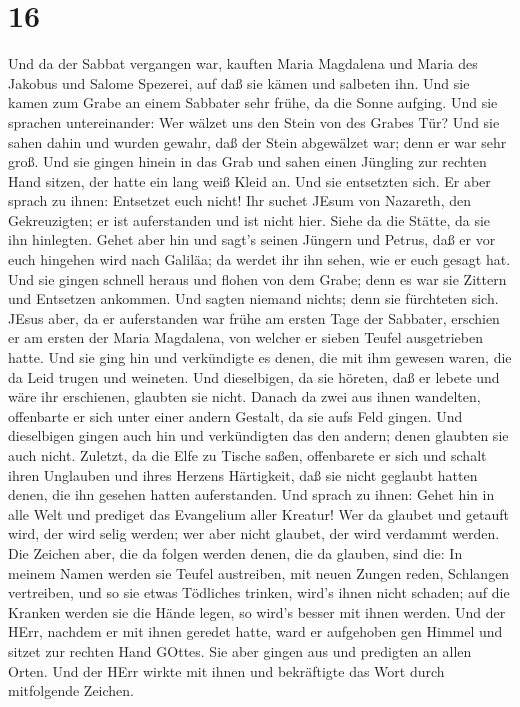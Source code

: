 \hypertarget{section-15}{%
\section{16}\label{section-15}}

 Und da der Sabbat vergangen war, kauften Maria Magdalena
und Maria des Jakobus und Salome Spezerei, auf daß sie kämen und
salbeten ihn.  Und sie kamen zum Grabe an einem Sabbater
sehr frühe, da die Sonne aufging.  Und sie sprachen
untereinander: Wer wälzet uns den Stein von des Grabes Tür? 
Und sie sahen dahin und wurden gewahr, daß der Stein abgewälzet war;
denn er war sehr groß.  Und sie gingen hinein in das Grab
und sahen einen Jüngling zur rechten Hand sitzen, der hatte ein lang
weiß Kleid an. Und sie entsetzten sich.  Er aber sprach zu
ihnen: Entsetzet euch nicht! Ihr suchet JEsum von Nazareth, den
Gekreuzigten; er ist auferstanden und ist nicht hier. Siehe da die
Stätte, da sie ihn hinlegten.  Gehet aber hin und sagt's
seinen Jüngern und Petrus, daß er vor euch hingehen wird nach Galiläa;
da werdet ihr ihn sehen, wie er euch gesagt hat.  Und sie
gingen schnell heraus und flohen von dem Grabe; denn es war sie Zittern
und Entsetzen ankommen. Und sagten niemand nichts; denn sie fürchteten
sich.  JEsus aber, da er auferstanden war frühe am ersten
Tage der Sabbater, erschien er am ersten der Maria Magdalena, von
welcher er sieben Teufel ausgetrieben hatte.  Und sie ging
hin und verkündigte es denen, die mit ihm gewesen waren, die da Leid
trugen und weineten.  Und dieselbigen, da sie höreten, daß
er lebete und wäre ihr erschienen, glaubten sie nicht. 
Danach da zwei aus ihnen wandelten, offenbarte er sich unter einer
andern Gestalt, da sie aufs Feld gingen.  Und dieselbigen
gingen auch hin und verkündigten das den andern; denen glaubten sie auch
nicht.  Zuletzt, da die Elfe zu Tische saßen, offenbarete
er sich und schalt ihren Unglauben und ihres Herzens Härtigkeit, daß sie
nicht geglaubt hatten denen, die ihn gesehen hatten auferstanden.
 Und sprach zu ihnen: Gehet hin in alle Welt und prediget
das Evangelium aller Kreatur!  Wer da glaubet und getauft
wird, der wird selig werden; wer aber nicht glaubet, der wird verdammt
werden.  Die Zeichen aber, die da folgen werden denen, die
da glauben, sind die: In meinem Namen werden sie Teufel austreiben, mit
neuen Zungen reden,  Schlangen vertreiben, und so sie etwas
Tödliches trinken, wird's ihnen nicht schaden; auf die Kranken werden
sie die Hände legen, so wird's besser mit ihnen werden. 
Und der HErr, nachdem er mit ihnen geredet hatte, ward er aufgehoben gen
Himmel und sitzet zur rechten Hand GOttes.  Sie aber gingen
aus und predigten an allen Orten. Und der HErr wirkte mit ihnen und
bekräftigte das Wort durch mitfolgende Zeichen.
